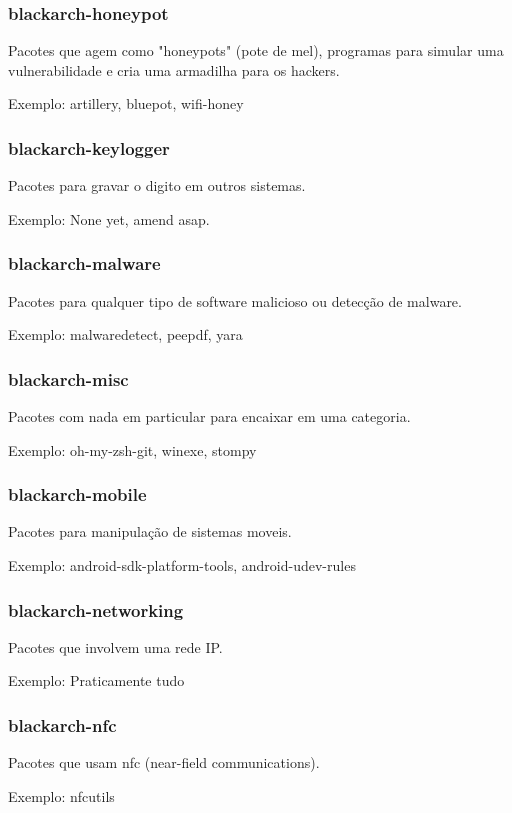 \documentclass[a4paper, oneside, 11pt]{book}
\begin{document}
\subsubsection{blackarch-honeypot}
Pacotes que agem como "honeypots" (pote de mel), programas para simular uma vulnerabilidade e cria uma armadilha para os hackers.

Exemplo: artillery, bluepot, wifi-honey

\subsubsection{blackarch-keylogger}
Pacotes para gravar o digito em outros sistemas.

Exemplo: None yet, amend asap.

\subsubsection{blackarch-malware}
Pacotes para qualquer tipo de software malicioso ou detecção de
malware.

Exemplo: malwaredetect, peepdf, yara

\subsubsection{blackarch-misc}
Pacotes com nada em particular para encaixar em uma categoria.

Exemplo: oh-my-zsh-git, winexe, stompy

\subsubsection{blackarch-mobile}
Pacotes para manipulação de sistemas moveis.

Exemplo: android-sdk-platform-tools, android-udev-rules

\subsubsection{blackarch-networking}
Pacotes que involvem uma rede IP.

Exemplo: Praticamente tudo

\subsubsection{blackarch-nfc}
Pacotes que usam nfc (near-field communications).

Exemplo: nfcutils
\end{document}
